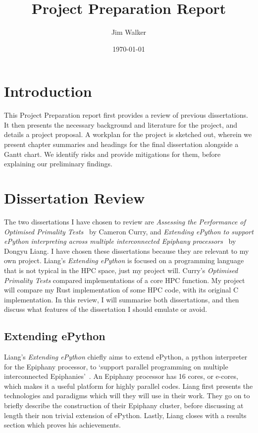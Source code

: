 \documentclass{article}[a4]
\begin{document}
\title{Project Preparation Report}
\author{Jim Walker}
\date{\today}

\makeEPCCtitle

\thispagestyle{empty}

\pagebreak
\tableofcontents
\pagebreak

\section{Introduction}
This Project Preparation report first provides a review of previous dissertations. It then presents the necessary background and literature for the project, and details a project proposal. A workplan for the project is sketched out, wherein we present chapter summaries and headings for the final dissertation alongside a Gantt chart. We identify risks and provide mitigations for them, before explaining our preliminary findings.
\section{Dissertation Review}
The two dissertations I have chosen to review are \textit{Assessing the Performance of Optimised Primality Tests}~\cite{Curry2016} by Cameron Curry, and \textit{Extending ePython to support ePython interpreting across multiple interconnected Epiphany processors}~\cite{Liang2017} by Dongyu Liang. I have chosen these dissertations because they are relevant to my own project. Liang's \textit{Extending ePython} is focused on a programming language that is not typical in the HPC space, just my project will. Curry's \textit{Optimised Primality Tests} compared implementations of a core HPC function. My project will compare my Rust implementation of some HPC code, with its original C implementation. In this review, I will summarise both dissertations, and then discuss what features of the dissertation I should emulate or avoid.

\subsection{Extending ePython}

Liang's \textit{Extending ePython} chiefly aims to extend ePython, a python interpreter for the Epiphany processor, to `support parallel programming on multiple interconnected Epiphanies'~\cite{Liang2017}. An Epiphany processor has 16 cores, or e-cores, which makes it a useful platform for highly parallel codes. Liang first presents the technologies and paradigms which will they will use in their work. They go on to briefly describe the construction of their Epiphany cluster, before discussing at length their non trivial extension of ePython. Lastly, Liang closes with a results section which proves his achievements.
\end{document}
